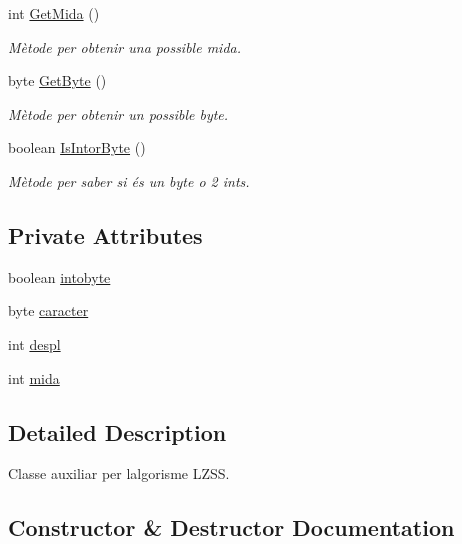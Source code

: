 \begin{DoxyCompactItemize}
int \hyperlink{classdomini_1_1utils_1_1IntorByte_abccf2f9cda2f62acdf0c1342f9acdead}{Get\+Mida} ()
\begin{DoxyCompactList}\small\item\em Mètode per obtenir una possible mida. \end{DoxyCompactList}\item 
byte \hyperlink{classdomini_1_1utils_1_1IntorByte_afd907b7001011bbca374605fb11491f4}{Get\+Byte} ()
\begin{DoxyCompactList}\small\item\em Mètode per obtenir un possible byte. \end{DoxyCompactList}\item 
boolean \hyperlink{classdomini_1_1utils_1_1IntorByte_a4fcfaf967d0c82b8147d632da4e238d0}{Is\+Intor\+Byte} ()
\begin{DoxyCompactList}\small\item\em Mètode per saber si és un byte o 2 int\textquotesingle{}s. \end{DoxyCompactList}\end{DoxyCompactItemize}
\subsection*{Private Attributes}
\begin{DoxyCompactItemize}
\item 
boolean \hyperlink{classdomini_1_1utils_1_1IntorByte_aee013881ecae778d25cab7c0b7655528}{intobyte}
\item 
byte \hyperlink{classdomini_1_1utils_1_1IntorByte_adbb2e8c31ead2f27d85ff39683b9a8a7}{caracter}
\item 
int \hyperlink{classdomini_1_1utils_1_1IntorByte_a83872b8acc9ab187acbc2175d5bf320e}{despl}
\item 
int \hyperlink{classdomini_1_1utils_1_1IntorByte_a6dd2ad21efcfb2bcfff716f5e04794d9}{mida}
\end{DoxyCompactItemize}


\subsection{Detailed Description}
Classe auxiliar per l\textquotesingle{}algorisme L\+Z\+SS. 

\subsection{Constructor \& Destructor Documentation}
\mbox{\label{classdomini_1_1utils_1_1IntorByte_ac2bae675cf6c4d8880acedeefaf24060}} 
